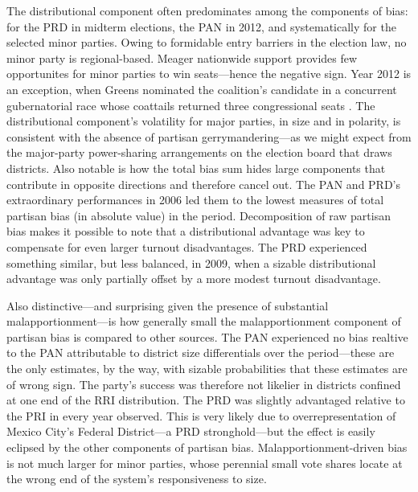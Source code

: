 \documentclass[letter,12pt]{article}
\begin{document}
The distributional component often predominates among the components of bias: for the PRD in midterm elections, the PAN in 2012, and systematically for the selected minor parties. Owing to formidable entry barriers in the election law, no minor party is regional-based. Meager nationwide support provides few opportunites for minor parties to win seats---hence the negative sign. Year 2012 is an exception, when Greens nominated the coalition's candidate in a concurrent gubernatorial race whose coattails returned three congressional seats \citep{magar.gubCoatMx.2012}. The distributional component's volatility for major parties, in size and in polarity, is consistent with the absence of partisan gerrymandering---as we might expect from the major-party power-sharing arrangements on the election board that draws districts. Also notable is how the total bias sum hides large components that contribute in opposite directions and therefore cancel out. The PAN and PRD's extraordinary performances in 2006 led them to the lowest measures of total partisan bias (in absolute value) in the period. Decomposition of raw partisan bias makes it possible to note that a distributional advantage was key to compensate for even larger turnout disadvantages. The PRD experienced something similar, but less balanced, in 2009, when a sizable distributional advantage was only partially offset by a more modest turnout disadvantage. 

Also distinctive---and surprising given the presence of substantial malapportionment---is how generally small the malapportionment component of partisan bias is compared to other sources. The PAN experienced no bias realtive to the PAN attributable to district size differentials over the period---these are the only estimates, by the way, with sizable probabilities that these estimates are of wrong sign. The party's success was therefore not likelier in districts confined at one end of the RRI distribution. The PRD was slightly advantaged relative to the PRI in every year observed. This is very likely due to overrepresentation of Mexico City's Federal District---a PRD stronghold---but the effect is easily eclipsed by the other components of partisan bias. \citep[The drop from +.14 to +.05 between 2003 and 2006 actually coincides with reapportionment and the accessory reduction---not removal---of the capital's overrepresentation in Congress, see][.]{altman.magar.mcd.trelles2014apsa} Malapportionment-driven bias is not much larger for minor parties, whose perennial small vote shares locate at the wrong end of the system's responsiveness to size. 
\end{document}
